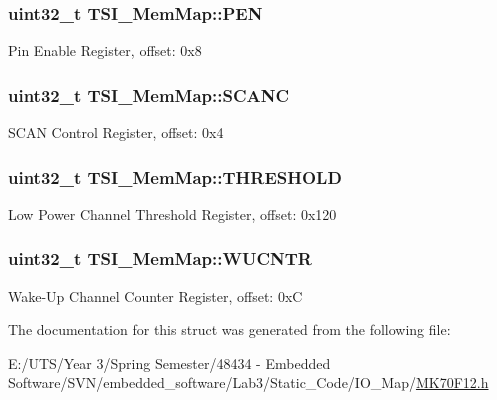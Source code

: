 \subsubsection[{P\+E\+N}]{\setlength{\rightskip}{0pt plus 5cm}uint32\+\_\+t T\+S\+I\+\_\+\+Mem\+Map\+::\+P\+E\+N}\label{struct_t_s_i___mem_map_a37c8a06461ca09948d6a65a1289bccd9}
Pin Enable Register, offset\+: 0x8 \hypertarget{struct_t_s_i___mem_map_abbf29c929817b57dbec256343e066a85}{}
\subsubsection[{S\+C\+A\+N\+C}]{\setlength{\rightskip}{0pt plus 5cm}uint32\+\_\+t T\+S\+I\+\_\+\+Mem\+Map\+::\+S\+C\+A\+N\+C}\label{struct_t_s_i___mem_map_abbf29c929817b57dbec256343e066a85}
S\+C\+A\+N Control Register, offset\+: 0x4 \hypertarget{struct_t_s_i___mem_map_a716863c50b790ef08399633c624ad313}{}
\subsubsection[{T\+H\+R\+E\+S\+H\+O\+L\+D}]{\setlength{\rightskip}{0pt plus 5cm}uint32\+\_\+t T\+S\+I\+\_\+\+Mem\+Map\+::\+T\+H\+R\+E\+S\+H\+O\+L\+D}\label{struct_t_s_i___mem_map_a716863c50b790ef08399633c624ad313}
Low Power Channel Threshold Register, offset\+: 0x120 \hypertarget{struct_t_s_i___mem_map_ae36ce42bd55889c91be08af94a07203e}{}
\subsubsection[{W\+U\+C\+N\+T\+R}]{\setlength{\rightskip}{0pt plus 5cm}uint32\+\_\+t T\+S\+I\+\_\+\+Mem\+Map\+::\+W\+U\+C\+N\+T\+R}\label{struct_t_s_i___mem_map_ae36ce42bd55889c91be08af94a07203e}
Wake-\/\+Up Channel Counter Register, offset\+: 0x\+C 

The documentation for this struct was generated from the following file\+:\begin{DoxyCompactItemize}
\item 
E\+:/\+U\+T\+S/\+Year 3/\+Spring Semester/48434 -\/ Embedded Software/\+S\+V\+N/embedded\+\_\+software/\+Lab3/\+Static\+\_\+\+Code/\+I\+O\+\_\+\+Map/\hyperlink{_m_k70_f12_8h}{M\+K70\+F12.\+h}\end{DoxyCompactItemize}
